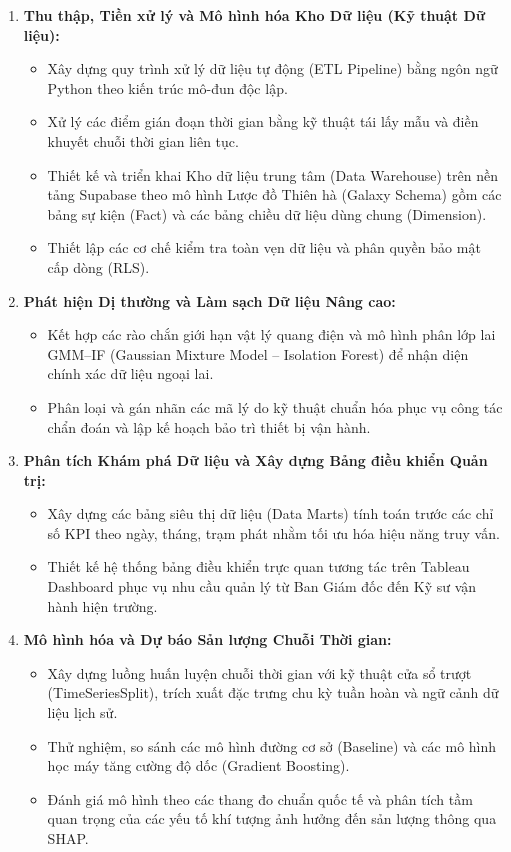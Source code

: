 \documentclass[12pt, a4paper]{report}
\begin{document}
\begin{enumerate}[label=\arabic*., leftmargin=*]
    \item \textbf{Thu thập, Tiền xử lý và Mô hình hóa Kho Dữ liệu (Kỹ thuật Dữ liệu):}
    \begin{itemize}[noitemsep]
        \item Xây dựng quy trình xử lý dữ liệu tự động (ETL Pipeline) bằng ngôn ngữ Python theo kiến trúc mô-đun độc lập.
        \item Xử lý các điểm gián đoạn thời gian bằng kỹ thuật tái lấy mẫu và điền khuyết chuỗi thời gian liên tục.
        \item Thiết kế và triển khai Kho dữ liệu trung tâm (Data Warehouse) trên nền tảng Supabase theo mô hình Lược đồ Thiên hà (Galaxy Schema) gồm các bảng sự kiện (Fact) và các bảng chiều dữ liệu dùng chung (Dimension).
        \item Thiết lập các cơ chế kiểm tra toàn vẹn dữ liệu và phân quyền bảo mật cấp dòng (RLS).
    \end{itemize}
    \item \textbf{Phát hiện Dị thường và Làm sạch Dữ liệu Nâng cao:}
    \begin{itemize}[noitemsep]
        \item Kết hợp các rào chắn giới hạn vật lý quang điện và mô hình phân lớp lai GMM--IF (Gaussian Mixture Model -- Isolation Forest) để nhận diện chính xác dữ liệu ngoại lai.
        \item Phân loại và gán nhãn các mã lý do kỹ thuật chuẩn hóa phục vụ công tác chẩn đoán và lập kế hoạch bảo trì thiết bị vận hành.
    \end{itemize}
    \item \textbf{Phân tích Khám phá Dữ liệu và Xây dựng Bảng điều khiển Quản trị:}
    \begin{itemize}[noitemsep]
        \item Xây dựng các bảng siêu thị dữ liệu (Data Marts) tính toán trước các chỉ số KPI theo ngày, tháng, trạm phát nhằm tối ưu hóa hiệu năng truy vấn.
        \item Thiết kế hệ thống bảng điều khiển trực quan tương tác trên Tableau Dashboard phục vụ nhu cầu quản lý từ Ban Giám đốc đến Kỹ sư vận hành hiện trường.
    \end{itemize}
    \item \textbf{Mô hình hóa và Dự báo Sản lượng Chuỗi Thời gian:}
    \begin{itemize}[noitemsep]
        \item Xây dựng luồng huấn luyện chuỗi thời gian với kỹ thuật cửa sổ trượt (TimeSeriesSplit), trích xuất đặc trưng chu kỳ tuần hoàn và ngữ cảnh dữ liệu lịch sử.
        \item Thử nghiệm, so sánh các mô hình đường cơ sở (Baseline) và các mô hình học máy tăng cường độ dốc (Gradient Boosting).
        \item Đánh giá mô hình theo các thang đo chuẩn quốc tế và phân tích tầm quan trọng của các yếu tố khí tượng ảnh hưởng đến sản lượng thông qua SHAP.
    \end{itemize}
\end{enumerate}
\end{document}
